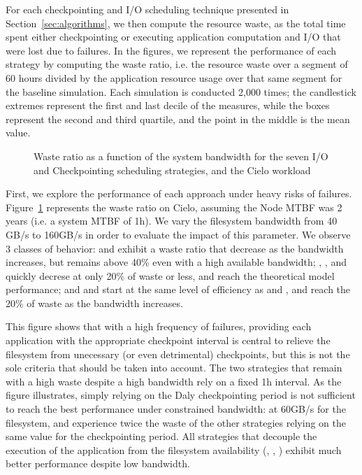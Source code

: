 For each checkpointing and I/O scheduling technique presented in
Section~\ref{sec:algorithms}, we then compute the resource waste, as
the total time spent either checkpointing or executing application
computation and I/O that were lost due to failures. In the figures, we
represent the performance of each strategy by computing the waste
ratio, i.e. the resource waste over a segment of 60 hours divided by
the application resource usage over that same segment for the baseline
simulation. Each simulation is conducted 2,000 times; the candlestick
extremes represent the first and last decile of the measures, while
the boxes represent the second and third quartile, and the point in
the middle is the mean value.

\begin{figure}
  \begin{center}
    \resizebox{\linewidth}{!}{}
  \end{center}
  \caption{Waste ratio as a function of the system bandwidth for the
    seven I/O and Checkpointing scheduling strategies, and the Cielo
    workload \label{fig:cielo-1hmtbf}}
\end{figure}

First, we explore the performance of each approach under heavy risks
of failures. Figure~\ref{fig:cielo-1hmtbf} represents the waste ratio
on Cielo, assuming the Node MTBF was 2 years (i.e. a system MTBF of
1h). We vary the filesystem bandwidth from 40 GB/s to 160GB/s in order
to evaluate the impact of this parameter. We observe 3 classes of
behavior: \propfixed and \bfifofixed exhibit a waste ratio that
decrease as the bandwidth increases, but remains above 40\% even with
a high available bandwidth; \fifodaly, \fifofixed, and \cooperative
quickly decrese at only 20\% of waste or less, and reach the
theoretical model performance; and \propdaly and \bfifodaly start at
the same level of efficiency as \propfixed and \bfifofixed, and reach
the 20\% of waste as the bandwidth increases.

This figure shows that with a high frequency of failures, providing
each application with the appropriate checkpoint interval is central
to relieve the filesystem from unecessary (or even detrimental)
checkpoints, but this is not the sole criteria that should be taken
into account. The two strategies that remain with a high waste despite
a high bandwidth rely on a fixed 1h interval. As the figure
illustrates, simply relying on the Daly checkpointing period is not
sufficient to reach the best performance under constrained bandwidth:
at 60GB/s for the filesystem, \propdaly and \bfifodaly experience
twice the waste of the other strategies relying on the same value for
the checkpointing period. All strategies that decouple the execution
of the application from the filesystem availability (\fifodaly,
\fifofixed, \cooperative) exhibit much better performance despite low
bandwidth.

